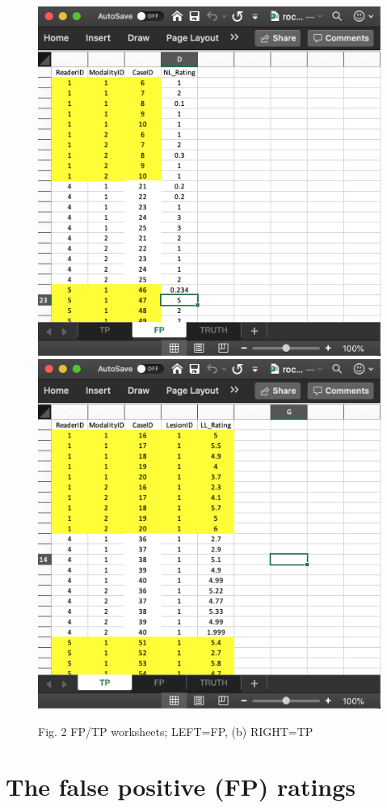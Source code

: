 \documentclass[]{book}
\begin{document}
\begin{figure}

{\centering \includegraphics[width=0.5\linewidth,height=0.2\textheight]{images/rocSpFp} \includegraphics[width=0.5\linewidth,height=0.2\textheight]{images/rocSpTp} 

}

\caption{Fig. 2 FP/TP worksheets; LEFT=FP, (b) RIGHT=TP}\label{fig:unnamed-chunk-9}
\end{figure}

\hypertarget{the-false-positive-fp-ratings-2}{%
\section{The false positive (FP) ratings}\label{the-false-positive-fp-ratings-2}}
\end{document}
